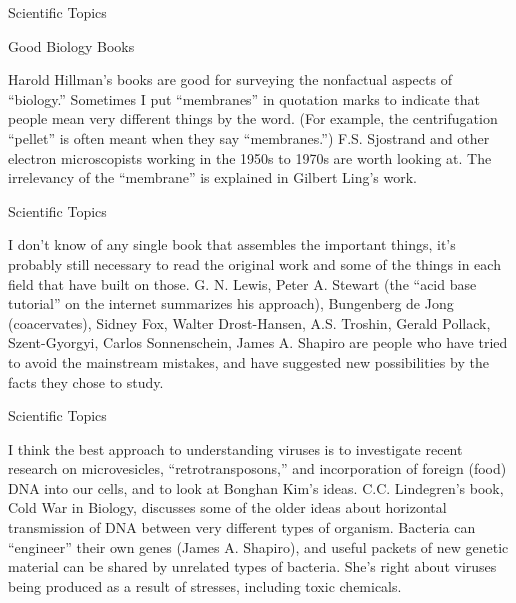 \documentclass[11pt,oneside,openany,extrafontsizes]{memoir}
\begin{document}
\begin{standalonequote}{Scientific Topics}
    \begin{note}
        Good Biology Books
    \end{note}

    \begin{answer}
        Harold Hillman's books are good for surveying the nonfactual aspects of \enquote{biology.} Sometimes I put \enquote{membranes} in quotation marks to indicate that people mean very different things by the word. (For example, the centrifugation \enquote{pellet} is often meant when they say \enquote{membranes.}) F.S. Sjostrand and other electron microscopists working in the 1950s to 1970s are worth looking at. The irrelevancy of the \enquote{membrane} is explained in Gilbert Ling's work.
    \end{answer}
\end{standalonequote}

\begin{standalonequote}{Scientific Topics}

    \begin{answer}
        I don't know of any single book that assembles the important things, it's probably still necessary to read the original work and some of the things in each field that have built on those. G. N. Lewis, Peter A. Stewart (the \enquote{acid base tutorial} on the internet summarizes his approach), Bungenberg de Jong (coacervates), Sidney Fox, Walter Drost-Hansen, A.S. Troshin, Gerald Pollack, Szent-Gyorgyi, Carlos Sonnenschein, James A. Shapiro are people who have tried to avoid the mainstream mistakes, and have suggested new possibilities by the facts they chose to study.
    \end{answer}
\end{standalonequote}

\begin{standalonequote}{Scientific Topics}

    \begin{answer}
        I think the best approach to understanding viruses is to investigate recent research on microvesicles, \enquote{retrotransposons,} and incorporation of foreign (food) DNA into our cells, and to look at Bonghan Kim's ideas. C.C. Lindegren's book, Cold War in Biology, discusses some of the older ideas about horizontal transmission of DNA between very different types of organism. Bacteria can \enquote{engineer} their own genes (James A. Shapiro), and useful packets of new genetic material can be shared by unrelated types of bacteria. She's right about viruses being produced as a result of stresses, including toxic chemicals.
    \end{answer}
\end{standalonequote}
\end{document}
